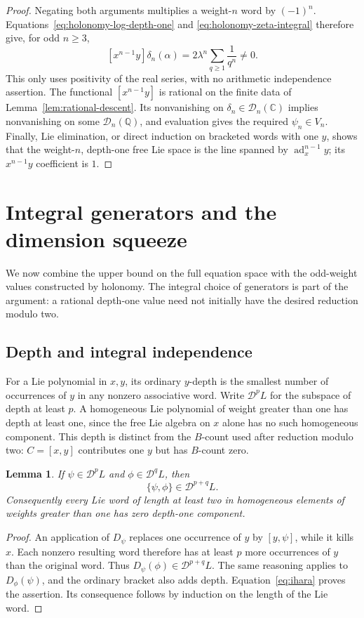 \documentclass[11pt]{article}
\newcommand{\Q}{\mathbb Q}
\newcommand{\CC}{\mathbb C}
\DeclareMathOperator{\ad}{ad}
\newtheorem{lemma}[theorem]{Lemma}
\theoremstyle{definition}
\theoremstyle{remark}
\numberwithin{equation}{section}
\begin{document}
\begin{proof}
Negating both arguments multiplies a weight-$n$ word by $(-1)^n$.
Equations~\eqref{eq:holonomy-log-depth-one} and
\eqref{eq:holonomy-zeta-integral} therefore give, for odd $n\geq3$,
\begin{equation}\label{eq:holonomy-nonzero-odd}
 [x^{n-1}y]\delta_n(\alpha)
 =2\lambda^n\sum_{q\geq1}\frac1{q^n}\ne0.
\end{equation}
This only uses positivity of the real series, with no arithmetic
independence assertion.  The functional $[x^{n-1}y]$ is rational on
the finite data of Lemma~\ref{lem:rational-descent}.  Its nonvanishing
on $\delta_n\in\mathcal D_n(\CC)$ implies nonvanishing on some
$\mathcal D_n(\Q)$, and evaluation gives the required $\psi_n\in V_n$.
Finally, Lie elimination, or direct induction on bracketed words with
one $y$, shows that the weight-$n$, depth-one free Lie space is the
line spanned by $\ad_x^{n-1}y$; its $x^{n-1}y$ coefficient is $1$.
\end{proof}

\section{Integral generators and the dimension squeeze}
\label{sec:induction}

We now combine the upper bound on the full equation space with the
odd-weight values constructed by holonomy.  The integral choice of
generators is part of the argument: a rational depth-one value need
not initially have the desired reduction modulo two.

\subsection{Depth and integral independence}
For a Lie polynomial in \(x,y\), its ordinary \(y\)-depth is the
smallest number of occurrences of \(y\) in any nonzero associative
word.  Write \(\mathcal D^p L\) for the subspace of depth at least
\(p\).  A homogeneous Lie polynomial of weight greater than one
has depth at least one, since the free Lie algebra on \(x\) alone
has no such homogeneous component.
This depth is distinct from the \(B\)-count used after reduction
modulo two: \(C=[x,y]\) contributes one \(y\) but has \(B\)-count zero.

\begin{lemma}\label{lem:depth-addition}
If \(\psi\in\mathcal D^p L\) and
\(\phi\in\mathcal D^q L\), then
\[
 \{\psi,\phi\}\in\mathcal D^{p+q}L.
\]
Consequently every Lie word of length at least two in homogeneous
elements of weights greater than one has zero depth-one component.
\end{lemma}
\begin{proof}
An application of \(D_\psi\) replaces one occurrence of \(y\) by
\([y,\psi]\), while it kills \(x\).  Each nonzero resulting word
therefore has at least \(p\) more occurrences of \(y\) than the
original word.  Thus
\(D_\psi(\phi)\in\mathcal D^{p+q}L\).
The same reasoning applies to \(D_\phi(\psi)\), and the ordinary
bracket also adds depth.  Equation~\eqref{eq:ihara} proves the
assertion.  Its consequence follows by induction on the length of
the Lie word.
\end{proof}
\end{document}
